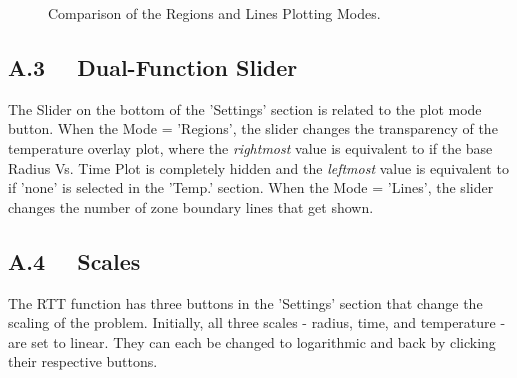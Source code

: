 \begin{figure}[h!]%
\centering
{}\qquad %
\caption[Regions Mode vs. Lines Mode]{Comparison of the Regions and Lines Plotting Modes.}
\label{fig:comparison}
\end{figure}

\subsection{A.3 \ \ Dual-Function Slider }

The Slider on the bottom of the 'Settings' section is related to the plot mode button.  When the Mode = 'Regions', the slider changes the transparency of the temperature overlay plot, where the \textit{rightmost} value is equivalent to if the base Radius Vs. Time Plot is completely hidden and the \textit{leftmost} value is equivalent to if 'none' is selected in the 'Temp.' section. When the Mode = 'Lines', the slider changes the number of zone boundary lines that get shown.

\subsection{A.4 \ \ Scales }

The RTT function has three buttons in the 'Settings' section that change the scaling of the problem.  Initially, all three scales - radius, time, and temperature - are set to linear.  They can each be changed to logarithmic and back by clicking their respective buttons.

